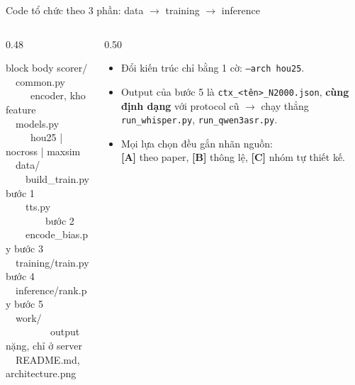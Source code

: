 \documentclass[aspectratio=169,xcolor=table]{beamer}
\newcommand{\hi}[1]{\textcolor{Primary}{\textbf{#1}}}
\begin{document}
\begin{frame}{Code tổ chức theo 3 phần: data $\rightarrow$ training $\rightarrow$ inference}
\begin{columns}[T]
\begin{column}{0.48\textwidth}
\footnotesize
\begin{beamercolorbox}[sep=0.5em,rounded=true]{block body}
\ttfamily\scriptsize
scorer/\\
\ \ common.py \ \ \ \ \ \textrm{\color{TextGray}encoder, kho feature}\\
\ \ models.py \ \ \ \ \ \textrm{\color{TextGray}hou25 | nocross | maxsim}\\
\ \ data/\\
\ \ \ \ build\_train.py \textrm{\color{TextGray}bước 1}\\
\ \ \ \ tts.py \ \ \ \ \ \ \ \ \textrm{\color{TextGray}bước 2}\\
\ \ \ \ encode\_bias.py \textrm{\color{TextGray}bước 3}\\
\ \ training/train.py \textrm{\color{TextGray}bước 4}\\
\ \ inference/rank.py \textrm{\color{TextGray}bước 5}\\
\ \ work/ \ \ \ \ \ \ \ \ \ \textrm{\color{TextGray}output nặng, chỉ ở server}\\
\ \ README.md, architecture.png
\end{beamercolorbox}
\end{column}
\begin{column}{0.50\textwidth}
\small
\begin{itemize}\itemsep4pt
\item Đổi kiến trúc chỉ bằng 1 cờ: \texttt{--arch hou25}.
\item Output của bước 5 là \texttt{ctx\_<tên>\_N2000.json}, \textbf{cùng định dạng} với protocol cũ $\rightarrow$ chạy thẳng \texttt{run\_whisper.py}, \texttt{run\_qwen3asr.py}.
\item Mọi lựa chọn đều gắn nhãn nguồn:\\
\hi{[A]} theo paper, \hi{[B]} thông lệ, \hi{[C]} nhóm tự thiết kế.
\end{itemize}
\end{column}
\end{columns}
\end{frame}

\end{document}
